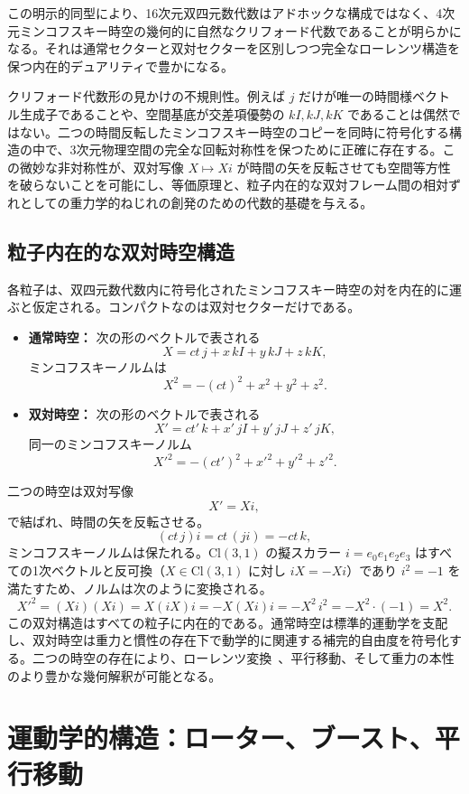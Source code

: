 \documentclass[a4paper]{article}
\begin{document}
この明示的同型により、16次元双四元数代数はアドホックな構成ではなく、4次元ミンコフスキー時空の幾何的に自然なクリフォード代数であることが明らかになる。それは通常セクターと双対セクターを区別しつつ完全なローレンツ構造を保つ内在的デュアリティで豊かになる。

クリフォード代数形の見かけの不規則性。例えば $j$ だけが唯一の時間様ベクトル生成子であることや、空間基底が交差項優勢の $kI,kJ,kK$ であることは偶然ではない。二つの時間反転したミンコフスキー時空のコピーを同時に符号化する構造の中で、3次元物理空間の完全な回転対称性を保つために正確に存在する。この微妙な非対称性が、双対写像 $X \mapsto Xi$ が時間の矢を反転させても空間等方性を破らないことを可能にし、等価原理と、粒子内在的な双対フレーム間の相対ずれとしての重力学的ねじれの創発のための代数的基礎を与える。

\subsection{粒子内在的な双対時空構造}

各粒子は、双四元数代数内に符号化されたミンコフスキー時空の対を内在的に運ぶと仮定される。コンパクトなのは双対セクターだけである。
\begin{itemize}
  \item \textbf{通常時空：} 次の形のベクトルで表される
  \[
  X = ct \, j + x \, kI + y \, kJ + z \, kK,
  \]
  ミンコフスキーノルムは
  \[
  X^2 = -(ct)^2 + x^2 + y^2 + z^2.
  \]

  \item \textbf{双対時空：} 次の形のベクトルで表される
  \[
  X' = ct' \, k + x' \, jI + y' \, jJ + z' \, jK,
  \]
  同一のミンコフスキーノルム
  \[
  X'^2 = -(ct')^2 + x'^2 + y'^2 + z'^2.
  \]
\end{itemize}
二つの時空は双対写像
\[
X' = X i,
\]
で結ばれ、時間の矢を反転させる。
\[
(ct \, j) i = ct \, (j i) = -ct \, k,
\]
ミンコフスキーノルムは保たれる。$\mathrm{Cl}(3,1)$ の擬スカラー $i = e_0 e_1 e_2 e_3$ はすべての1次ベクトルと反可換（$X \in \mathrm{Cl}(3,1)$ に対し $i X = -X i$）であり $i^2 = -1$ を満たすため、ノルムは次のように変換される。
\[
X'^2 = (X i)(X i) = X (i X) i = -X (X i) i = -X^2\, i^2 = -X^2 \cdot (-1) = X^2.
\]
この双対構造はすべての粒子に内在的である。通常時空は標準的運動学を支配し、双対時空は重力と慣性の存在下で動学的に関連する補完的自由度を符号化する。二つの時空の存在により、ローレンツ変換~\cite{lorentz1904}、平行移動、そして重力の本性のより豊かな幾何解釈が可能となる。

\section{運動学的構造：ローター、ブースト、平行移動}
\label{sec:kinematics}
\end{document}
